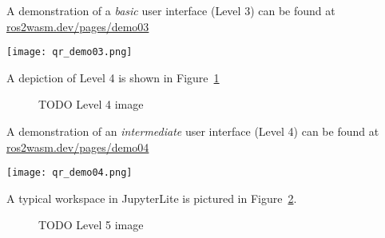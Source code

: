         \begin{tcolorbox}[title=Example 3]
            \begin{minipage}[t]{0.87\linewidth}
                \vspace*{0.5\baselineskip}
                A demonstration of a \textit{basic} user interface (Level 3) can
                be found at \href{https://ros2wasm.dev/pages/demo03/index.html}{\textsf{ros2wasm.dev/pages/demo03}}
            \end{minipage}\hfill%
            \begin{minipage}[t]{0.1\linewidth}
                \vspace*{0pt}
                \texttt{[image: qr\_demo03.png]}
            \end{minipage}
        \end{tcolorbox}

        A depiction of Level 4 is shown in Figure~\ref{fig:ui4}

        \begin{figure}[htbp]
            \centering
            \caption{TODO Level 4 image}\label{fig:ui4}
        \end{figure}

        \begin{tcolorbox}[title=Example 4]
            \begin{minipage}[t]{0.87\linewidth}
                \vspace*{0.5\baselineskip}
                A demonstration of an \textit{intermediate} user interface (Level 4) can
                be found at \href{https://ros2wasm.dev/pages/demo04/index.html}{\textsf{ros2wasm.dev/pages/demo04}}
            \end{minipage}\hfill%
            \begin{minipage}[t]{0.1\linewidth}
                \vspace*{0pt}
                \texttt{[image: qr\_demo04.png]}
            \end{minipage}
        \end{tcolorbox}

        A typical workspace in JupyterLite is pictured in Figure~\ref{fig:ui5}.

        \begin{figure}[htbp]
            \centering
            \caption{TODO Level 5 image}\label{fig:ui5}
        \end{figure}

